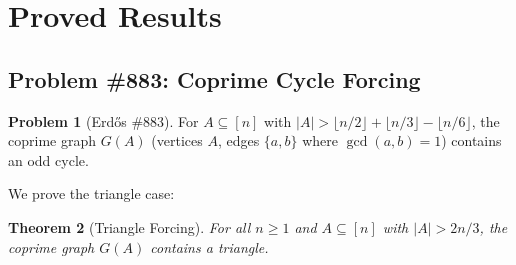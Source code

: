 \documentclass[11pt,a4paper]{article}
\newtheorem{theorem}{Theorem}[section]
\theoremstyle{definition}
\newtheorem{problem}[theorem]{Problem}
\theoremstyle{remark}
\begin{document}
\section{Proved Results}

\subsection{Problem \#883: Coprime Cycle Forcing}

\begin{problem}[Erd\H{o}s \#883]
For $A \subseteq [n]$ with $|A| > \lfloor n/2 \rfloor + \lfloor n/3 \rfloor
- \lfloor n/6 \rfloor$, the coprime graph $G(A)$ (vertices $A$, edges
$\{a,b\}$ where $\gcd(a,b)=1$) contains an odd cycle.
\end{problem}

We prove the triangle case:

\begin{theorem}[Triangle Forcing]\label{thm:883}
For all $n \geq 1$ and $A \subseteq [n]$ with $|A| > 2n/3$, the coprime
graph $G(A)$ contains a triangle.
\end{theorem}
\end{document}
